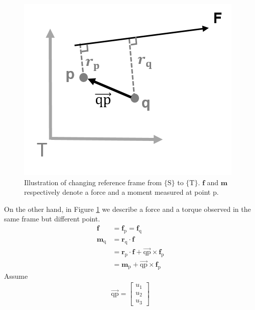 \par
\begin{figure}[htbp]
\begin{center}
\includegraphics[width=0.7\linewidth]{Images/sensor_comp 2.png}
\caption{
Illustration of changing reference frame from $\{\mathrm{S}\} $ to $\{\mathrm{T}\}$. $\boldsymbol{f}$ and $\boldsymbol{m}$ respectively denote a force and a moment measured at point p.
}\label{fig:sensor_comp2}
\end{center}
\end{figure}
\par\noindent
On the other hand, in Figure \ref{fig:sensor_comp2} we describe a force and a torque observed in the same frame but different point.
\begin{equation}
\begin{split}
\boldsymbol{f}				&= \boldsymbol{f}_\mathrm{p} = \boldsymbol{f}_\mathrm{q}\\
\boldsymbol{m}_\mathrm{q} 	&= \boldsymbol{r}_\mathrm{q} \cdot \boldsymbol{f}\\
			 				&= \boldsymbol{r}_\mathrm{p} \cdot \boldsymbol{f}+\overrightarrow{\mathrm{q}\mathrm{p}} \times \boldsymbol{f}_\mathrm{p}\\
			 				&= \boldsymbol{m}_\mathrm{p} + \overrightarrow{\mathrm{q}\mathrm{p}}\times \boldsymbol{f}_\mathrm{p}
\end{split}
\end{equation}
Assume
\begin{equation*}
\begin{split}
\overrightarrow{\mathrm{q}\mathrm{p}}
=
\begin{bmatrix}
u_1\\
u_2\\
u_3
\end{bmatrix}
\end{split}
\end{equation*}
